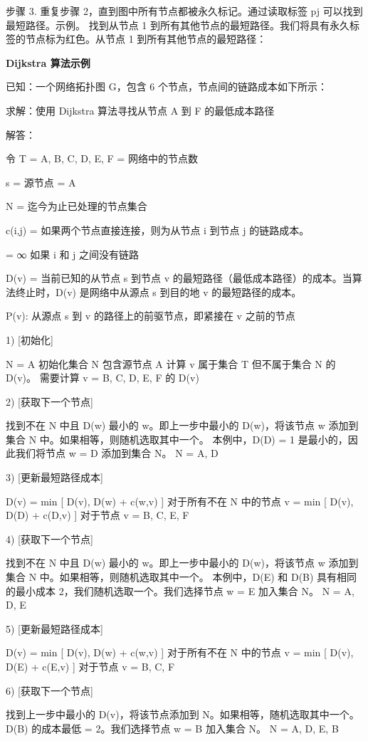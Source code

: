 \documentclass[oneside,UTF8]{ctexart}
\numberwithin{figure}{section} %
\begin{document}
步骤 3. 重复步骤 2，直到图中所有节点都被永久标记。通过读取标签 pj 可以找到最短路径。示例。 找到从节点 1 到所有其他节点的最短路径。我们将具有永久标签的节点标为红色。从节点 1 到所有其他节点的最短路径：

{\bf Dijkstra 算法示例}

已知：一个网络拓扑图 G，包含 6 个节点，节点间的链路成本如下所示：

求解：使用 Dijkstra 算法寻找从节点 A 到 F 的最低成本路径

解答：

令 T = {A, B, C, D, E, F} = 网络中的节点数

s = 源节点 = A

N = 迄今为止已处理的节点集合

c(i,j) = 如果两个节点直接连接，则为从节点 i 到节点 j 的链路成本。

= ∞ 如果 i 和 j 之间没有链路

D(v) = 当前已知的从节点 s 到节点 v 的最短路径（最低成本路径）的成本。当算法终止时，D(v) 是网络中从源点 s 到目的地 v 的最短路径的成本。

P(v): 从源点 s 到 v 的路径上的前驱节点，即紧接在 v 之前的节点

1) [初始化]

N = {A} 初始化集合 N 包含源节点 A
计算 v 属于集合 T 但不属于集合 N 的 D(v)。
需要计算 v = B, C, D, E, F 的 D(v)

2) [获取下一个节点]

找到不在 N 中且 D(w) 最小的 w。即上一步中最小的 D(w)，将该节点 w 添加到集合 N 中。如果相等，则随机选取其中一个。
本例中，D(D) = 1 是最小的，因此我们将节点 w = D 添加到集合 N。
N = { A, D }

3) [更新最短路径成本]

D(v) = min [ D(v), D(w) + c(w,v) ] 对于所有不在 N 中的节点 v
= min [ D(v), D(D) + c(D,v) ] 对于节点 v = B, C, E, F

4) [获取下一个节点]

找到不在 N 中且 D(w) 最小的 w。即上一步中最小的 D(w)，将该节点 w 添加到集合 N 中。如果相等，则随机选取其中一个。
本例中，D(E) 和 D(B) 具有相同的最小成本 2，我们随机选取一个。我们选择节点 w = E 加入集合 N。
N = { A, D, E }

5) [更新最短路径成本]

D(v) = min [ D(v), D(w) + c(w,v) ] 对于所有不在 N 中的节点 v
= min [ D(v), D(E) + c(E,v) ] 对于节点 v = B, C, F

6) [获取下一个节点]

找到上一步中最小的 D(v)，将该节点添加到 N。如果相等，随机选取其中一个。
D(B) 的成本最低 = 2。我们选择节点 w = B 加入集合 N。
N = { A, D, E, B }
\end{document}
